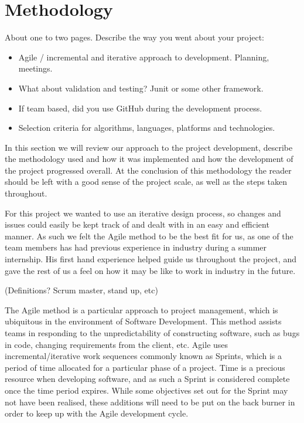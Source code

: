 
\chapter{Methodology}
About one to two pages.
Describe the way you went about your project:
\begin{itemize}
\item Agile / incremental and iterative approach to development. Planning, meetings.
\item What about validation and testing? Junit or some other framework.
\item If team based, did you use GitHub during the development process.
\item Selection criteria for algorithms, languages, platforms and technologies.
\end{itemize}

In this section we will review our approach to the project development, describe the methodology used and how it was implemented and how the development of the project progressed overall. At the conclusion of this methodology the reader should be left with a good sense of the project scale, as well as the steps taken throughout.

For this project we wanted to use an iterative design process, so changes and issues could easily be kept track of and dealt with in an easy and efficient manner. As such we felt the Agile method to be the best fit for us, as one of the team members has had previous experience in industry during a summer internship. His first hand experience helped guide us throughout the project, and gave the rest of us a feel on how it may be like to work in industry in the future.

(Definitions? Scrum master, stand up, etc)

The Agile method is a particular approach to project management, which is ubiquitous in the environment of Software Development. This method assists teams in responding to the unpredictability of constructing software, such as bugs in code, changing requirements from the client, etc. Agile uses incremental/iterative work sequences commonly known as Sprints, which is a period of time allocated for a particular phase of a project. Time is a precious resource when developing software, and as such a Sprint is considered complete once the time period expires. While some objectives set out for the Sprint may not have been realised, these additions will need to be put on the back burner in order to keep up with the Agile development cycle.

